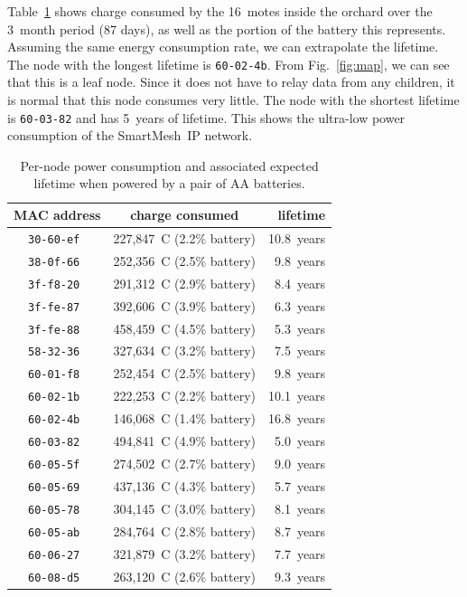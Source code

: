 \documentclass{sig-alternate}
\newcommand{\smip}                {SmartMesh~IP\xspace}
\begin{document}

Table~\ref{tab:stats_charge} shows charge consumed by the 16~motes inside the orchard over the 3~month period (87 days), as well as the portion of the battery this represents.
Assuming the same energy consumption rate, we can extrapolate the lifetime.
The node with the longest lifetime is {\tt 60-02-4b}.
From Fig.~\ref{fig:map}, we can see that this is a leaf node.
Since it does not have to relay data from any children, it is normal that this node consumes very little.
The node with the shortest lifetime is {\tt 60-03-82} and has 5~years of lifetime.
This shows the ultra-low power consumption of the \smip network.

\begin{table}
    \begin{tabular}{|c|c|r|}
        \hline
        MAC address    & charge consumed           &   lifetime \\
        \hline
        \tt{30-60-ef}  & 227,847~C (2.2\% battery) & 10.8~years \\
        \tt{38-0f-66}  & 252,356~C (2.5\% battery) &  9.8~years \\
        \tt{3f-f8-20}  & 291,312~C (2.9\% battery) &  8.4~years \\
        \tt{3f-fe-87}  & 392,606~C (3.9\% battery) &  6.3~years \\
        \tt{3f-fe-88}  & 458,459~C (4.5\% battery) &  5.3~years \\
        \tt{58-32-36}  & 327,634~C (3.2\% battery) &  7.5~years \\
        \tt{60-01-f8}  & 252,454~C (2.5\% battery) &  9.8~years \\
        \tt{60-02-1b}  & 222,253~C (2.2\% battery) & 10.1~years \\
        \tt{60-02-4b}  & 146,068~C (1.4\% battery) & 16.8~years \\
        \tt{60-03-82}  & 494,841~C (4.9\% battery) &  5.0~years \\
        \tt{60-05-5f}  & 274,502~C (2.7\% battery) &  9.0~years \\
        \tt{60-05-69}  & 437,136~C (4.3\% battery) &  5.7~years \\
        \tt{60-05-78}  & 304,145~C (3.0\% battery) &  8.1~years \\
        \tt{60-05-ab}  & 284,764~C (2.8\% battery) &  8.7~years \\
        \tt{60-06-27}  & 321,879~C (3.2\% battery) &  7.7~years \\
        \tt{60-08-d5}  & 263,120~C (2.6\% battery) &  9.3~years \\
        \hline
    \end{tabular}
    \caption{Per-node power consumption and associated expected lifetime when powered by a pair of AA batteries.}
    \label{tab:stats_charge}
\end{table}
\end{document}
